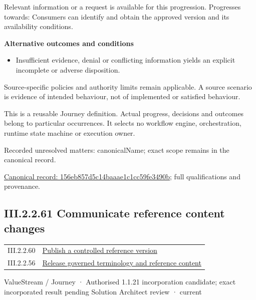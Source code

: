 Relevant information or a request is available for this progression. Progresses towards: Consumers can identify and obtain the approved version and its availability conditions.



\par\medskip\textbf{Alternative outcomes and conditions}\par


\begin{itemize}


\item Insufficient evidence, denial or conflicting information yields an explicit incomplete or adverse disposition.

\end{itemize}


Source-specific policies and authority limits remain applicable. A source scenario is evidence of intended behaviour, not of implemented or satisfied behaviour.



This is a reusable Journey definition. Actual progress, decisions and outcomes belong to particular occurrences. It selects no workflow engine, orchestration, runtime state machine or execution owner.


{\small Recorded unresolved matters: canonicalName; exact scope remains in the canonical record.}\par
{\footnotesize \href{../../../../../../../continuum/strategy/value-stream/156eb857d5c14baaae1c1cc59fe3490b.md}{Canonical record: 156eb857d5c14baaae1c1cc59fe3490b}; full qualifications and provenance.}\par
\subsection*{III.2.2.61 Communicate reference content changes}
\label{navigation:III.2.2.61}

\begin{longtable}{p{.22\linewidth}p{.73\linewidth}}
III.2.2.60 & \hyperref[element:156eb857d5c14baaae1c1cc59fe3490b]{Publish a controlled reference version} \\
III.2.2.56 & \hyperref[element:e9a8a77c5f9c4361af4dfcfa607ece2d]{Release governed terminology and reference content} \\
\end{longtable}
\label{element:9faf0704382e4b428814c2e9bf72eec0}
{\small ValueStream / Journey · Authorised 1.1.21 incorporation candidate; exact incorporated result pending Solution Architect review · current}\par

